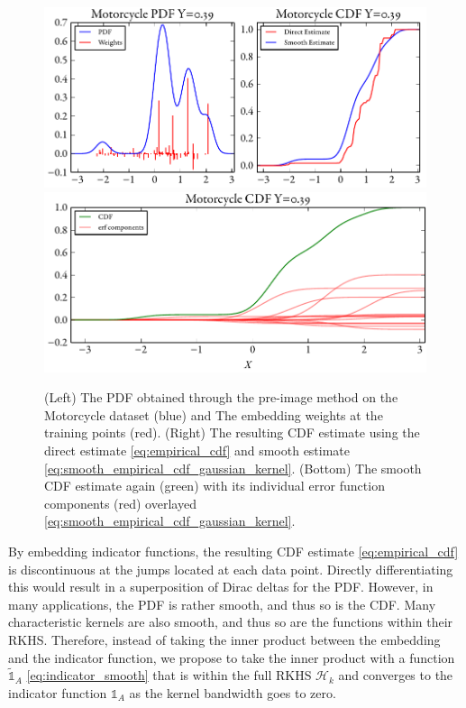 \documentclass[twoside]{article} \usepackage{aistats2017}
\theoremstyle{definition}
\theoremstyle{theorem}
\begin{document}
		\begin{figure}
			\begin{center}
				\includegraphics[width=\columnwidth]{figures/cumulativeexamplesmooth}
				\includegraphics[width=\columnwidth]{figures/cumulativeexampleerf}
			\end{center}
			\caption{\small (Left) The PDF obtained through the pre-image method on the Motorcycle dataset (blue) and The embedding weights at the training points (red). (Right) The resulting CDF estimate using the direct estimate \eqref{eq:empirical_cdf} and smooth estimate \eqref{eq:smooth_empirical_cdf_gaussian_kernel}. (Bottom) The smooth CDF estimate again (green) with its individual error function components (red) overlayed \eqref{eq:smooth_empirical_cdf_gaussian_kernel}.}
			\label{fig:direct_quantile_regression}
		\end{figure}
		
		By embedding indicator functions, the resulting CDF estimate \eqref{eq:empirical_cdf} is discontinuous at the jumps located at each data point. Directly differentiating this would result in a superposition of Dirac deltas for the PDF. However, in many applications, the PDF is rather smooth, and thus so is the CDF. Many characteristic kernels are also smooth, and thus so are the functions within their RKHS. Therefore, instead of taking the inner product between the embedding and the indicator function, we propose to take the inner product with a function $\tilde{\mathbb{1}}_{A}$ \eqref{eq:indicator_smooth} that is within the full RKHS $\mathcal{H}_{k}$ and converges to the indicator function $\mathbb{1}_{A}$ as the kernel bandwidth goes to zero.
		
\end{document}
